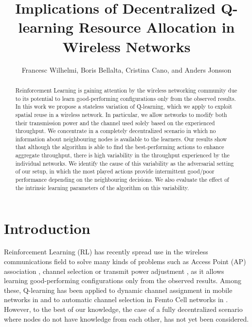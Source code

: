 \documentclass{article}
\begin{document}
	\setcounter{page}{56}
	
	\title{Implications of Decentralized Q-learning Resource Allocation in Wireless Networks}
	
	\author{Francesc Wilhelmi, Boris Bellalta, Cristina Cano, and Anders Jonsson}
	\date{ }
	\maketitle
	
	\begin{abstract}
		Reinforcement Learning is gaining attention by the wireless networking community due to its potential to learn good-performing configurations only from the observed results. In this work we propose a stateless variation of Q-learning, which we apply to exploit spatial reuse in a wireless network. In particular, we allow networks to modify both their transmission power and the channel used solely based on the experienced throughput. We concentrate in a completely decentralized scenario in which no information about neighbouring nodes is available to the learners. Our results show that although the algorithm is able to find the best-performing actions to enhance aggregate throughput, there is high variability in the throughput experienced by the individual networks.
		We identify the cause of this variability as the adversarial setting of our setup, in which the most played actions provide intermittent good/poor performance depending on the neighbouring decisions. We also evaluate the effect of the intrinsic learning parameters of the algorithm on this variability.		
	\end{abstract}
	
	\section{Introduction}
	Reinforcement Learning (RL) has recently spread use in the wireless communications field to solve many kinds of problems such as Access Point (AP) association \cite{chen2010ap}, channel selection \cite{maghsudi2015channel} or transmit power adjustment \cite{maghsudi2015joint}, as it allows learning good-performing configurations only from the observed results. Among these, Q-learning has been applied to dynamic channel assignment in mobile networks in \cite{nie1999qlearning} and to automatic channel selection in Femto Cell networks in \cite{bennis2010q}. However, to the best of our knowledge, the case of a fully decentralized scenario where nodes do not have knowledge from each other, has not yet been considered.  
	
\end{document}
